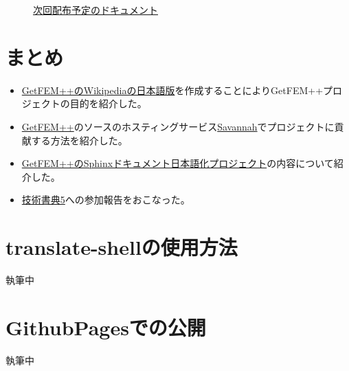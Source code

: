 \documentclass{../../style/ltjoc}
\begin{document}
\begin{figure}[htbp]
\centering
{}
\caption{\href{https://techbookfest.org}{次回配布予定のドキュメント}}
\label{fig:tecbookfest6-book}
\end{figure}
\section{まとめ}
\begin{itemize}
  \item{\href{https://ja.wikipedia.org/wiki/GetFEM++}{GetFEM++のWikipediaの日本語版}を作成することによりGetFEM++プロジェクトの目的を紹介した。}
  \item{\href{http://getfem.org}{GetFEM++}のソースのホスティングサービス\href{https://savannah.gnu.org}{Savannah}でプロジェクトに貢献する方法を紹介した。}
  \item{\href{http://www.sphinx-doc.org/ja/stable/intl.html}{GetFEM++のSphinxドキュメント日本語化プロジェクト}の内容について紹介した。}
  \item{\href{https://techbookfest.org/event/tbf05}{技術書典5}への参加報告をおこなった。}
\end{itemize}
\appendix
\section{translate-shellの使用方法}
執筆中
\section{GithubPagesでの公開}
執筆中
\end{document}
